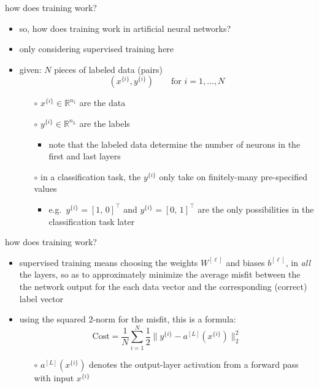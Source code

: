 \documentclass[xcolor={svgnames},
               hyperref={colorlinks,citecolor=DeepPink4,linkcolor=FireBrick,urlcolor=Maroon}]
               {beamer}
\newcommand{\RR}{\mathbb{R}}
\begin{document}
\begin{frame}{how does training work?}

\begin{itemize}
\item so, how does training work in artificial neural networks?
\item only considering \alert{supervised training} here
\item given: $N$ pieces of \alert{labeled data} (pairs)
    $$(x^{\{i\}}, y^{\{i\}}) \qquad \text{for } i=1,\dots,N$$

    \begin{itemize}
    \item[$\circ$] $x^{\{i\}} \in \RR^{n_1}$ are the \alert{data}
    \item[$\circ$] $y^{\{i\}} \in \RR^{n_L}$ are the \alert{labels}
        \begin{itemize}
        \item note that the labeled data determine the number of neurons in the first and last layers
        \end{itemize}
    \item[$\circ$] in a \alert{classification task}, the $y^{\{i\}}$ only take on finitely-many pre-specified values
        \begin{itemize}
        \item e.g.~$y^{\{i\}} = [1,\, 0]^\top$ and $y^{\{i\}} = [0,\, 1]^\top$ are the only possibilities in the classification task later
        \end{itemize}
    \end{itemize}
\end{itemize}
\end{frame}

\begin{frame}{how does training work?}

\begin{itemize}
\item \alert{supervised training} means choosing the weights $W^{[\ell]}$ and biases $b^{[\ell]}$, in \emph{all} the layers, so as to approximately minimize the \alert{average misfit} between the the network output for the each data vector and the corresponding (\alert{correct}) label vector
\item using the squared $2$-norm for the misfit, this is a formula:
    $$\text{Cost} = \frac{1}{N} \sum_{i=1}^N \frac{1}{2} \|y^{\{i\}} - a^{[L]}(x^{\{i\}})\|_2^2$$

    \begin{itemize}
    \item[$\circ$] $a^{[L]}(x^{\{i\}})$ denotes the output-layer activation from a forward pass with input $x^{\{i\}}$
    \end{itemize}
\end{itemize}
\end{frame}
\end{document}
